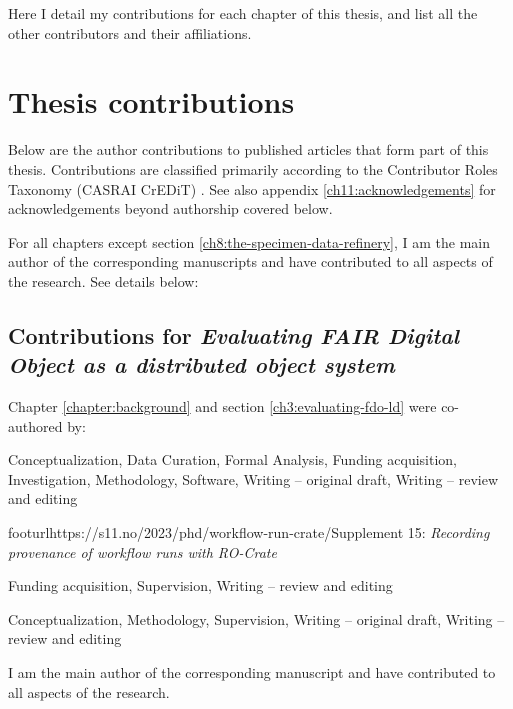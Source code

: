 \label{ch10:contributions} 

Here I detail my contributions for each chapter of this thesis, and
list all the other contributors and their affiliations.



\section{Thesis contributions}\label{ch10:my-contributions}

Below are the author contributions to published articles that form part
of this thesis. Contributions are classified primarily according to the
Contributor Roles Taxonomy (CASRAI CrEDiT) \cite{Brand 2015}. See 
also appendix \vref{ch11:acknowledgements} for acknowledgements beyond authorship covered below.

For all chapters except section \ref{ch8:the-specimen-data-refinery}, I am the main author of the corresponding
manuscripts and have contributed to all aspects of the research. See details below:



\subsection{Contributions for \emph{Evaluating FAIR Digital
Object as a distributed object system}}\label{ch10:fdo}

Chapter \vref{chapter:background} and section \vref{ch3:evaluating-fdo-ld} were co-authored by:

\begin{description}
\tightlist
\item[Stian Soiland-Reyes]
Conceptualization, Data Curation, Formal Analysis, Funding acquisition, Investigation,
Methodology, Software, Writing -- original draft, Writing -- review and
editing
\item[Carole Goble]footurl{https://s11.no/2023/phd/workflow-run-crate/}{Supplement 15}: \emph{Recording provenance of workflow runs with RO-Crate}

Funding acquisition, Supervision, Writing -- review and editing
\item[Paul Groth]
Conceptualization, Methodology, Supervision, Writing -- original draft, Writing -- review
and editing
\end{description}

I am the main author of the corresponding manuscript and have contributed to all aspects of the research. 

